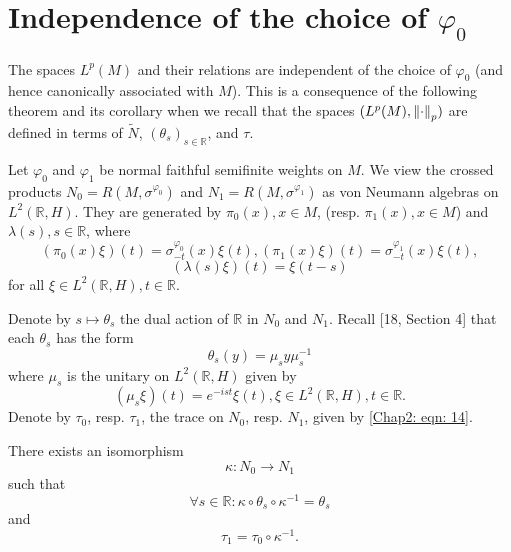 \section{Independence of the choice of $\varphi_0$}
The spaces $L^p(M)$ and their relations are independent of the choice of $\varphi_0$ (and hence canonically associated with $M$). This is a consequence of the following theorem and its corollary when we recall that the spaces $(L^p(M), \norm{\cdot}_p)$ are defined in terms of $\tilde{N}$, $(\theta_s)_{s\in \mathbb{R}}$, and $\tau$.\par
Let $\varphi_0$ and $\varphi_1$ be normal faithful semifinite weights on $M$. We view the crossed products $N_0=R(M,\sigma^{\varphi_0})$ and $N_1=R(M,\sigma^{\varphi_1})$ as von Neumann algebras on $L^2(\mathbb{R},H)$. They are generated by $\pi_0(x), x\in M$, (resp. $\pi_1(x), x\in M$) and $\lambda(s),s\in \mathbb{R}$, where
\[
    (\pi_0(x)\xi)(t)=\sigma_{-t}^{\varphi_0}(x)\xi(t),(\pi_1(x)\xi)(t)=\sigma_{-t}^{\varphi_1}(x)\xi(t),
\]
\[
    (\lambda(s)\xi)(t)=\xi(t-s)
\]
for all $\xi\in L^2(\mathbb{R},H), t\in \mathbb{R}$.\par
Denote by $s\mapsto \theta_s$ the dual action of $\mathbb{R}$ in $N_0$ and $N_1$. Recall [18, Section 4] that each $\theta_s$ has the form
\begin{equation}
    \theta_s(y)=\mu_sy\mu_s^{-1}
\end{equation}
where $\mu_s$ is the unitary on $L^2(\mathbb{R},H)$ given by
\begin{equation}
    (\mu_s\xi)(t)=e^{-ist}\xi(t),\xi\in L^2(\mathbb{R},H),t\in \mathbb{R}.
\end{equation}
Denote by $\tau_0$, resp. $\tau_1$, the trace on $N_0$, resp. $N_1$, given by \eqref{Chap2: eqn: 14}.
\begin{theorem}
    There exists an isomorphism
    \[
        \kappa:N_0\to N_1
    \]
    such that
    \begin{equation}
        \forall s\in \mathbb{R}:\kappa\circ\theta_s\circ\kappa^{-1}=\theta_s
    \end{equation}
    and
    \begin{equation}
        \tau_1=\tau_0\circ\kappa^{-1}.
    \end{equation}
\end{theorem}
